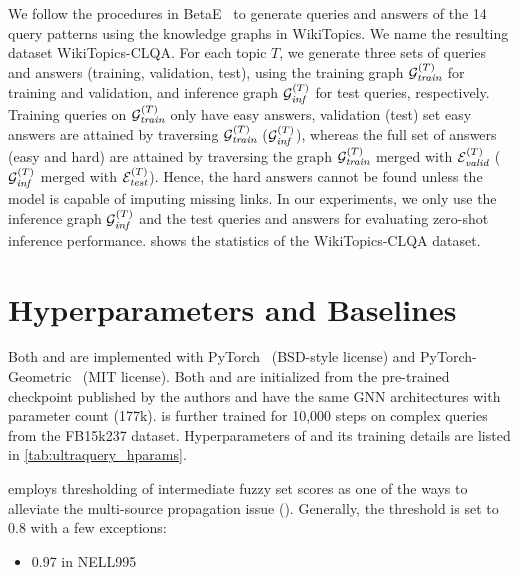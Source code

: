 We follow the procedures in BetaE~\citep{betae} to generate queries and answers of the 14 query patterns using the knowledge graphs in WikiTopics. We name the resulting dataset WikiTopics-CLQA. 
For each topic $T$, we generate three sets of queries and answers (training, validation, test), using the training graph $\mathcal{G}_{\textit{train}}^{(T)}$ for training and validation, and inference graph $\mathcal{G}_{\textit{inf}}^{(T)}$ for test queries, respectively. 
Training queries on $\mathcal{G}_{\textit{train}}^{(T)}$ only have easy answers, 
validation (test) set easy answers are attained by traversing  $\mathcal{G}_{\textit{train}}^{(T)}$ ($\mathcal{G}_{\textit{inf}}^{(T)}$), whereas the full set of answers (easy and hard) are attained by traversing the graph $\mathcal{G}_{\textit{train}}^{(T)}$ merged with $\mathcal{E}^{(T)}_{\textit{valid}}$ ($\mathcal{G}_{\textit{inf}}^{(T)}$ merged with $\mathcal{E}^{(T)}_{\textit{test}}$). Hence, the hard answers cannot be found unless the model is capable of imputing missing links.
In our experiments, we only use the inference graph $\mathcal{G}_{\textit{inf}}^{(T)}$ and the test queries and answers for evaluating zero-shot inference performance.
%
 shows the statistics of the WikiTopics-CLQA dataset. 

\section{Hyperparameters and Baselines}
\label{app:hyperparams}

Both \method and \methodlp are implemented with PyTorch~\cite{pytorch} (BSD-style license) and PyTorch-Geometric~\cite{pyg} (MIT license).
Both \method and \methodlp are initialized from the pre-trained \ultra checkpoint published by the authors and have the same GNN architectures with parameter count (177k).
\method is further trained for 10,000 steps on complex queries from the FB15k237 dataset. 
Hyperparameters of \method and its training details are listed in \autoref{tab:ultraquery_hparams}.

\methodlp employs thresholding of intermediate fuzzy set scores as one of the ways to alleviate the multi-source propagation issue (). 
Generally, the threshold is set to 0.8 with a few exceptions:
\begin{itemize}[leftmargin=*]
    \item 0.97 in NELL995
\end{itemize}

